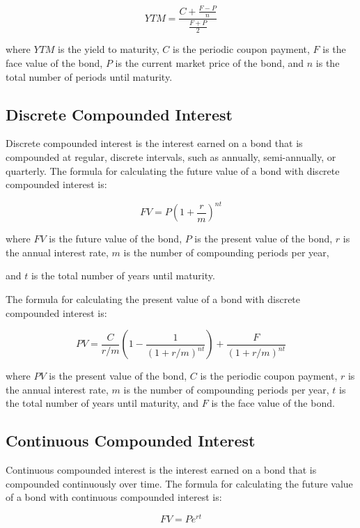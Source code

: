 \documentclass{article}
\theoremstyle{mytheoremstyle}
\theoremstyle{mytheoremstyle}
\theoremstyle{myproblemstyle}
\begin{document}
\begin{equation}
YTM = \frac{C + \frac{F-P}{n}}{\frac{F+P}{2}}
\end{equation}

where $YTM$ is the yield to maturity, $C$ is the periodic coupon payment, $F$ is the face value of the bond, $P$ is the current market price of the bond, and $n$ is the total number of periods until maturity.

\subsection{Discrete Compounded Interest}
Discrete compounded interest is the interest earned on a bond that is compounded at regular, discrete intervals, such as annually, semi-annually, or quarterly. The formula for calculating the future value of a bond with discrete compounded interest is:

\begin{equation}
FV = P \left( 1 + \frac{r}{m} \right)^{nt}
\end{equation}

where $FV$ is the future value of the bond, $P$ is the present value of the bond, $r$ is the annual interest rate, $m$ is the number of compounding periods per year,

and $t$ is the total number of years until maturity.

The formula for calculating the present value of a bond with discrete compounded interest is:

\begin{equation}
PV = \frac{C}{r/m} \left( 1 - \frac{1}{(1 + r/m)^{nt}} \right) + \frac{F}{(1 + r/m)^{nt}}
\end{equation}

where $PV$ is the present value of the bond, $C$ is the periodic coupon payment, $r$ is the annual interest rate, $m$ is the number of compounding periods per year, $t$ is the total number of years until maturity, and $F$ is the face value of the bond.

\subsection{Continuous Compounded Interest}
Continuous compounded interest is the interest earned on a bond that is compounded continuously over time. The formula for calculating the future value of a bond with continuous compounded interest is:

\begin{equation}
FV = Pe^{rt}
\end{equation}
\end{document}
